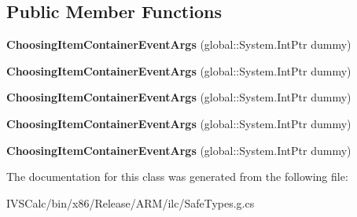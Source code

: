 \subsection*{Public Member Functions}
\begin{DoxyCompactItemize}
\item 
\mbox{\label{class_windows_1_1_u_i_1_1_xaml_1_1_controls_1_1_choosing_item_container_event_args_a97d43923f64f5e72ab12003cd8c79385}} 
{\bfseries Choosing\+Item\+Container\+Event\+Args} (global\+::\+System.\+Int\+Ptr dummy)
\item 
\mbox{\label{class_windows_1_1_u_i_1_1_xaml_1_1_controls_1_1_choosing_item_container_event_args_a97d43923f64f5e72ab12003cd8c79385}} 
{\bfseries Choosing\+Item\+Container\+Event\+Args} (global\+::\+System.\+Int\+Ptr dummy)
\item 
\mbox{\label{class_windows_1_1_u_i_1_1_xaml_1_1_controls_1_1_choosing_item_container_event_args_a97d43923f64f5e72ab12003cd8c79385}} 
{\bfseries Choosing\+Item\+Container\+Event\+Args} (global\+::\+System.\+Int\+Ptr dummy)
\item 
\mbox{\label{class_windows_1_1_u_i_1_1_xaml_1_1_controls_1_1_choosing_item_container_event_args_a97d43923f64f5e72ab12003cd8c79385}} 
{\bfseries Choosing\+Item\+Container\+Event\+Args} (global\+::\+System.\+Int\+Ptr dummy)
\item 
\mbox{\label{class_windows_1_1_u_i_1_1_xaml_1_1_controls_1_1_choosing_item_container_event_args_a97d43923f64f5e72ab12003cd8c79385}} 
{\bfseries Choosing\+Item\+Container\+Event\+Args} (global\+::\+System.\+Int\+Ptr dummy)
\end{DoxyCompactItemize}


The documentation for this class was generated from the following file\+:\begin{DoxyCompactItemize}
\item 
I\+V\+S\+Calc/bin/x86/\+Release/\+A\+R\+M/ilc/Safe\+Types.\+g.\+cs\end{DoxyCompactItemize}
